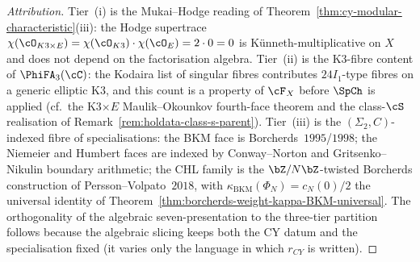 \begin{proof}[Attribution]
Tier~(i) is the Mukai--Hodge reading of
Theorem~\ref{thm:cy-modular-characteristic}(iii): the Hodge supertrace
$\chi(\cO_{K3 \times E}) = \chi(\cO_{K3}) \cdot \chi(\cO_E) = 2 \cdot 0
= 0$ is K\"unneth-multiplicative on $X$ and does not depend on the
factorisation algebra. Tier~(ii) is the K3-fibre content of
$\PhiFA_3(\cC)$: the Kodaira list of singular fibres
contributes $24 I_1$-type fibres on a generic elliptic K3, and this
count is a property of $\cF_X$ before $\SpCh$ is applied (cf.\
the K3$\times E$ Maulik--Okounkov fourth-face theorem and the class-$\cS$ realisation of
Remark~\ref{rem:holdata-class-s-parent}). Tier~(iii) is the
$(\Sigma_2, C)$-indexed fibre of specialisations: the BKM face is
Borcherds~$1995$/$1998$; the Niemeier and Humbert faces are indexed by
Conway--Norton and Gritsenko--Nikulin boundary arithmetic; the CHL
family is the $\bZ/N\bZ$-twisted Borcherds construction of
Persson--Volpato~$2018$, with $\kappa_{\mathrm{BKM}}(\Phi_N) = c_N(0)/2$
the universal identity of
\cite{VolI}
Theorem~\ref{thm:borcherds-weight-kappa-BKM-universal}. The
orthogonality of the algebraic seven-presentation to the three-tier
partition follows because the algebraic slicing keeps both the CY
datum and the specialisation fixed (it varies only the language in
which $r_{CY}$ is written).
\end{proof}

